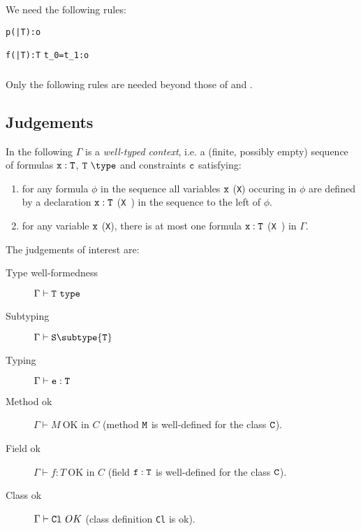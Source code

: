 We need the following rules:
{\footnotesize
{}
	{\Gamma \vdash \tt p(\bar{\tt T}):o}

	{\tt\Gamma \vdash \tt f(\bar{\tt T}):T}
	{\tt\Gamma \vdash t_0=t_1:o}
}

\subsubsection{\FXGDP} 
Only the following rules are needed beyond those of \FXG{} and \FXD{}.





\subsection{Judgements}

In the following $\Gamma$ is a {\em well-typed context}, i.e.{} a
(finite, possibly empty) sequence of formulas $\tt x:T$, $\tt T\
\type$ and constraints $\tt c$ satisfying:
\begin{enumerate}
  \item for any formula $\phi$ in the sequence all variables $\tt x$
    ({\tt X}) occuring in $\phi$ are defined by a declaration $\tt
    x:T$ ({\tt X\ \type}) in the sequence to the left of $\phi$.

  \item for any variable $\tt x$ ({\tt X}), there is at most one
  formula $\tt x:T$ ({\tt X\ \type})  in $\Gamma$.
\end{enumerate}

The judgements of interest are:
\begin{description}
  \item[Type well-formedness]  $\Gamma \vdash {\tt T} \ {\tt type}$
  \item[Subtyping] $\Gamma \vdash {\tt S} \subtype {\tt T}$
  \item[Typing]    $\Gamma   \vdash {\tt e:T}$
  \item[Method ok] $\Gamma \vdash M\ \mbox{OK in $C$}$ (method $\tt M$ is well-defined for the class $\tt C$). 
  \item[Field ok]  $\Gamma \vdash f:T\ \mbox{OK in $C$}$ (field $\tt f:T$ is well-defined for the class $\tt C$).
  \item[Class ok] $\Gamma \vdash {\tt Cl} \ OK$ (class definition {\tt Cl} is ok). 
\end{description}



